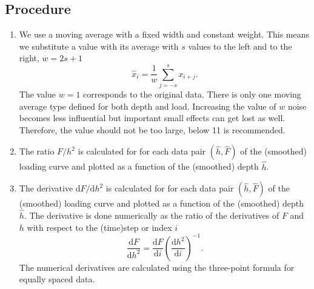 \subsection{Procedure}\label{Ph2_calc}
\begin{enumerate}
 \item 
We use a moving average with a fixed width and constant weight. This means we substitute a value with its average with $s$ values to the left and to the right, $w = 2s + 1$ 
$$
\hat{x} _i = \frac1w \sum_{j = -s}^{s} x_{i+j}.
$$
The value $w = 1$ corresponds to the original data. There is only one moving average type defined for both depth and load.
Increasing the value of $w$ noise becomes less influential but important small effects can get lost as well. 
Therefore, the value should not be too large, below 11 is recommended.

\item The ratio $F/h^2$ is calculated for for each data pair $(\hat{h},\hat{F})$ of the (smoothed) loading curve and plotted as a function of the (smoothed) depth $\hat{h}$.
\item The derivative $\mathrm{d}F/\mathrm{d}h^2$ is calculated for for each data pair $(\hat{h},\hat{F})$ of the (smoothed) loading curve and plotted as a function of the (smoothed) depth $\hat{h}$.
The derivative is done numerically as the ratio of the derivatives of $F$ and $h$ with respect to the (time)step or index $i$ 
$$
\frac{\mathrm{d}F}{\mathrm{d} h^2} = \frac{\mathrm{d}F}{\mathrm{d}i} \left(  \frac{\mathrm{d}h^2}{\mathrm{d}i}\right)^{-1}.
$$
The numerical derivatives are calculated using the three-point formula for equally spaced data.
\end{enumerate}

